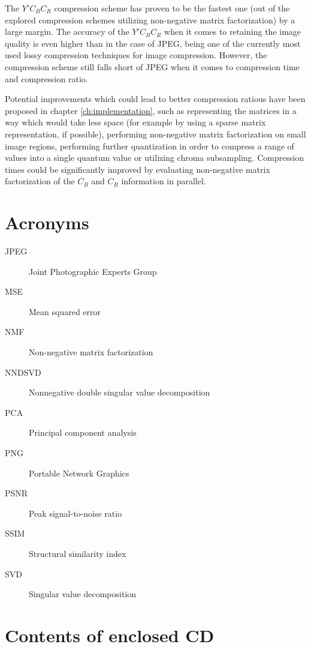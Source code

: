 \documentclass[thesis=M,english]{FITthesis}[2012/10/20]
\begin{document}
The $Y'C_BC_R$ compression scheme has proven to be the fastest one (out of the
explored compression schemes utilizing non-negative matrix factorization) by
a large margin. The accuracy of the $Y'C_BC_R$ when it comes to retaining the
image quality is even higher than in the case of JPEG, being one of the currently most
used lossy compression techniques for image compression. However, the compression
scheme still falls short of JPEG when it comes to compression time and compression
ratio.

Potential improvements which could lead to better compression ratious have been proposed
in chapter \ref{ch:implementation}, such as representing the matrices in a way
which would take less space (for example by using a sparse matrix representation, if
possible), performing non-negative matrix factorization on small image regions, performing
further quantization in order to compress a range of values into a single quantum
value or utilizing chroma subsampling. Compression times could be significantly improved
by evaluating non-negative matrix factorization of the $C_B$ and $C_R$ information in parallel.





\appendix

\chapter{Acronyms}
\begin{description}
  \item[JPEG] Joint Photographic Experts Group
  \item[MSE] Mean squared error
  \item[NMF] Non-negative matrix factorization
  \item[NNDSVD] Nonnegative double singular value decomposition
  \item[PCA] Principal component analysis
  \item[PNG] Portable Network Graphics
  \item[PSNR] Peak signal-to-noise ratio
  \item[SSIM] Structural similarity index
  \item[SVD] Singular value decomposition
\end{description}


\chapter{Contents of enclosed CD}


\begin{figure}
\end{figure}
\end{document}
